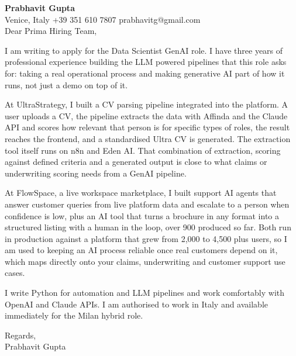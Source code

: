 \documentclass[a4paper,10.5pt]{article}
\begin{document}
\textbf{Prabhavit Gupta}\\
Venice, Italy \textbar{} +39 351 610 7807 \textbar{} prabhavitg@gmail.com\\[10pt]
Dear Prima Hiring Team,

I am writing to apply for the Data Scientist GenAI role. I have three years of professional experience building the LLM powered pipelines that this role asks for: taking a real operational process and making generative AI part of how it runs, not just a demo on top of it.

At UltraStrategy, I built a CV parsing pipeline integrated into the platform. A user uploads a CV, the pipeline extracts the data with Affinda and the Claude API and scores how relevant that person is for specific types of roles, the result reaches the frontend, and a standardised Ultra CV is generated. The extraction tool itself runs on n8n and Eden AI. That combination of extraction, scoring against defined criteria and a generated output is close to what claims or underwriting scoring needs from a GenAI pipeline.

At FlowSpace, a live workspace marketplace, I built support AI agents that answer customer queries from live platform data and escalate to a person when confidence is low, plus an AI tool that turns a brochure in any format into a structured listing with a human in the loop, over 900 produced so far. Both run in production against a platform that grew from 2,000 to 4,500 plus users, so I am used to keeping an AI process reliable once real customers depend on it, which maps directly onto your claims, underwriting and customer support use cases.

I write Python for automation and LLM pipelines and work comfortably with OpenAI and Claude APIs. I am authorised to work in Italy and available immediately for the Milan hybrid role.

Regards,\\
Prabhavit Gupta
\end{document}

